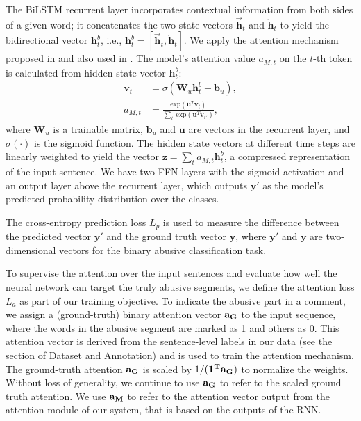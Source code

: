 \documentclass[letterpaper]{article} %
\begin{document}
The BiLSTM recurrent layer incorporates contextual information from both sides of a given word; it concatenates the two state vectors $\overrightarrow{\mathbf{h}}_{t}$ and $\overleftarrow{\mathbf{h}}_{t}$ to yield the bidirectional vector $\mathbf{h}^{b}_{t}$, i.e., $\mathbf{h}^{b}_{t}=[\overrightarrow{\mathbf{h}}_{t},\overleftarrow{\mathbf{h}}_{t}]$.
We apply the attention mechanism proposed in \cite{yang2016hierarchical} and also used in \cite{chakrabarty2019pay}. The model's attention value $a_{M,t}$ on the $t$-th token is calculated from hidden state vector $\mathbf{h}^{b}_{t}$:
\begin{align}
\mathbf{v}_{t} &= \sigma(\mathbf{W}_{u}\mathbf{h}^{b}_{t} + \mathbf{b}_{u}), \\
a_{M,t} &= \frac{\text{exp}(\mathbf{u}^{T}\mathbf{v}_{t})}{\sum\limits_{t'}\text{exp}(\mathbf{u}^{T}\mathbf{v}_{t'})},
\end{align}
where $\mathbf{W}_{u}$ is a trainable matrix, $\mathbf{b}_{u}$ and $\mathbf{u}$ are vectors in the recurrent layer, and $\sigma(\cdot)$ is the sigmoid function.
The hidden state vectors at different time steps are linearly weighted to yield the vector $\mathbf{z}=\sum\limits_{t}a_{M,t}\mathbf{h}_{t}^{b}$, a compressed representation of the input sentence. We have two FFN layers with the sigmoid activation and an output layer above the recurrent layer, which  outputs  $\mathbf{y}'$ as the model's predicted probability distribution over the classes.

The cross-entropy prediction loss $L_{p}$ is used to measure the difference between the predicted vector $\mathbf{y}'$ and the ground truth vector $\mathbf{y}$, where $\mathbf{y}'$ and $\mathbf{y}$ are two-dimensional vectors for the binary abusive classification task.

To supervise the attention over the input sentences and evaluate how well the neural network can target the truly abusive segments, we define the attention loss $L_{a}$ as part of our training objective. To indicate the abusive part in a comment, we assign a (ground-truth) binary attention vector $\bf{a}_{G}$ to the input sequence, where the words in the abusive segment are marked as 1 and others as 0. This attention vector is derived from the sentence-level labels in our data (see the section of Dataset and Annotation) and is used to train the attention mechanism. The ground-truth attention $\bf{a}_{G}$ is scaled by $1/(\bf{1}^{T}\bf{a}_{G})$ to normalize the weights. Without loss of generality, we continue to use $\bf{a}_{G}$ to refer to the scaled ground truth attention.  We use $\bf{a}_{M}$ to refer to  the attention vector output from the attention module of our system, that is   based on the outputs of the RNN.
\end{document}
